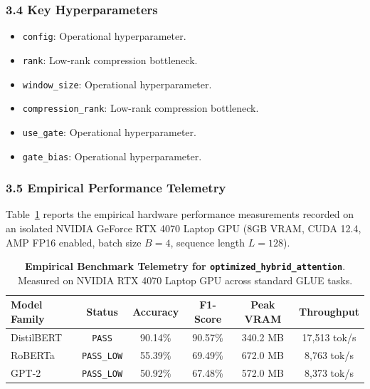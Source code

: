\subsubsection*{3.4 Key Hyperparameters}
\begin{itemize}
    \item \texttt{config}: Operational hyperparameter.
    \item \texttt{rank}: Low-rank compression bottleneck.
    \item \texttt{window\_size}: Operational hyperparameter.
    \item \texttt{compression\_rank}: Low-rank compression bottleneck.
    \item \texttt{use\_gate}: Operational hyperparameter.
    \item \texttt{gate\_bias}: Operational hyperparameter.
\end{itemize}

\subsubsection*{3.5 Empirical Performance Telemetry}
Table~\ref{tab:telemetry_optimized_hybrid_attention} reports the empirical hardware performance measurements recorded on an isolated NVIDIA GeForce RTX 4070 Laptop GPU (8GB VRAM, CUDA 12.4, AMP FP16 enabled, batch size $B=4$, sequence length $L=128$).

\begin{table}[h]
\centering
\small
\caption{\textbf{Empirical Benchmark Telemetry for \texttt{optimized\_hybrid\_attention}}. Measured on NVIDIA RTX 4070 Laptop GPU across standard GLUE tasks.}
\label{tab:telemetry_optimized_hybrid_attention}
\begin{tabular*}{\columnwidth}{@{\extracolsep{\fill}}lccccc}
\toprule
\textbf{Model Family} & \textbf{Status} & \textbf{Accuracy} & \textbf{F1-Score} & \textbf{Peak VRAM} & \textbf{Throughput} \\
\midrule
DistilBERT & \texttt{PASS} & 90.14\% & 90.57\% & 340.2 MB & 17,513 tok/s \\
RoBERTa & \texttt{PASS\_LOW} & 55.39\% & 69.49\% & 672.0 MB & 8,763 tok/s \\
GPT-2 & \texttt{PASS\_LOW} & 50.92\% & 67.48\% & 572.0 MB & 8,373 tok/s \\
\bottomrule
\end{tabular*}
\end{table}


